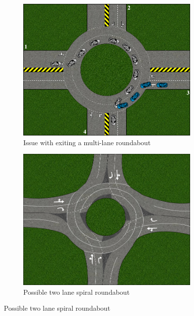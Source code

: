 \documentclass{article}
\begin{document}
	\begin{figure}
		\centering
		\begin{subfigure}{5 cm}
			\centering
			\includegraphics[width=\textwidth]{CarCrash3}
			\caption{Issue with exiting a multi-lane roundabout}
			\label{CarCrash3}
		\end{subfigure}
		\begin{subfigure}{5 cm}
			\centering
			\includegraphics[width=\textwidth]{spiralRoundabout}
			\caption{Possible two lane spiral roundabout}
			\label{SpiralRoundabout}
			\end{subfigure}
	\end{figure}
	
\end{document}
